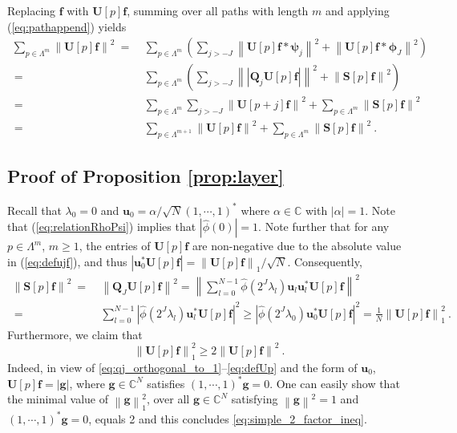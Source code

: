 \documentclass{article}
\def\l{\lambda}
\def\CC{\mathbb{C}}
\def\BQ{\boldsymbol{Q}}
\def\BS{\boldsymbol{S}}
\def\BU{\boldsymbol{U}}
\def\Bf{\boldsymbol{f}}
\def\Bg{\boldsymbol{g}}
\def\Bu{\boldsymbol{u}}
\newcommand{\abs}[1]{\left| #1 \right|}
\newcommand{\norm}[1]{\left\lVert#1\right\rVert}
\begin{document}
Replacing $\Bf$ with $\BU[p]\Bf$, summing over all paths with length $m$ and applying (\ref{eq:pathappend}) yields
\begin{equation}\label{eq:pathbreakeq}
\begin{aligned}
\sum_{p \in \Lambda^m} \norm{\BU[p] \Bf}^2 ~=~ & \sum_{p \in \Lambda^m} \left( \sum_{j > -J} \norm{\BU[p] \Bf \ast \boldsymbol{\psi}_j}^2 +  \norm{\BU[p] \Bf \ast \boldsymbol{\phi}_J}^2 \right) \\
~=~ & \sum_{p \in \Lambda^m} \left( \sum_{j > -J} \norm{\abs{\BQ_j \BU[p] \Bf}}^2 +  \norm{\BS[p]\Bf}^2 \right) \\
~=~ & \sum_{p \in \Lambda^m} \sum_{j > -J} \norm{ \BU[p+j] \Bf}^2 + \sum_{p \in \Lambda^m}  \norm{\BS[p]\Bf}^2  \\
~=~ & \sum_{p \in \Lambda^{m+1}} \norm{\BU[p] \Bf}^2 + \sum_{p \in \Lambda^m} \norm{\BS[p] \Bf}^2 ~.
\end{aligned}
\end{equation}

\subsection{Proof of Proposition \ref{prop:layer}}
Recall that $\l_0 = 0$ and $\Bu_0 = \alpha/\sqrt{N} (1, \cdots, 1)^*$ where $\alpha \in \CC$ with $\abs{\alpha} = 1$. Note that (\ref{eq:relationRhoPsi}) implies that $\abs{\hat{\phi}(0)} = 1$. Note further that for any $p \in \Lambda^m$, $m \geq 1$, the entries of $\BU[p] \Bf$ are non-negative due to the absolute value in (\ref{eq:defujf}), and thus $\abs{\Bu_0^* \BU[p] \Bf} = \norm{\BU[p]\Bf}_1 / \sqrt{N}$. Consequently,
\begin{equation}
\label{eq:proof_best_rate}
\begin{aligned}
\norm{\BS[p]\Bf}^2 ~=~ & \norm{\BQ_J \BU[p]\Bf}^2 =  \norm{\sum_{l=0}^{N-1} \hat{\phi}(2^J \l_l) \Bu_l \Bu_l^* \BU[p]\Bf}^2 \\ 
~=~ & \sum_{l=0}^{N-1} \abs{ \hat{\phi}(2^J \l_l) \Bu_l^* \BU[p] \Bf}^2 
\geq  \abs{ \hat{\phi}(2^J \l_0) \Bu_0^* \BU[p] \Bf}^2 
=  \frac{1}{N} \norm{\BU[p] \Bf}_1^2~.
\end{aligned}
\end{equation}
Furthermore, we claim that 
\begin{equation}
\label{eq:simple_2_factor_ineq}
\norm{\BU[p] \Bf}_1^2 \geq  2 \norm{\BU[p] \Bf}^2 ~.
\end{equation}
Indeed, in view of \eqref{eq:qj_orthogonal_to_1}--\eqref{eq:defUp} and the form of $\Bu_0$, $\BU[p] \Bf = |\Bg|$, where $\Bg \in \CC^N$ satisfies $(1, \cdots, 1)^* \Bg=0$. One can easily show that the minimal value of $\norm{\Bg}_1^2$, over all $\Bg \in \CC^N$ satisfying $\norm{\Bg}^2=1$ and $(1, \cdots, 1)^* \Bg=0$, equals 2 and this concludes \eqref{eq:simple_2_factor_ineq}.
\end{document}
